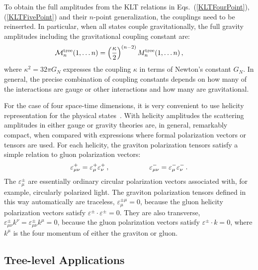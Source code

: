 \documentclass[12pt]{livrev}
\begin{document}
To obtain the full amplitudes from the KLT relations in
Eqs.~(\ref{KLTFourPoint}), (\ref{KLTFivePoint}) and their $n$-point
generalization, the couplings need to be reinserted.  In particular,
when all states couple gravitationally, the full gravity amplitudes
including the gravitational coupling constant are:
%
\begin{equation}
{\cal M}_n^{\rm tree} (1,\ldots n) = 
\left({  \kappa \over 2} \right)^{(n-2)} 
M_n^{\rm tree}(1,\ldots n)\,, \hskip 1 cm 
\label{GravityCouplingAmplitude}
\end{equation}
where $\kappa^2 = 32\pi G_N$ expresses the coupling $\kappa$ in terms
of Newton's constant $G_N$.  In general, the precise combination of
coupling constants depends on how many of the interactions are gauge 
or other interactions and how many are gravitational.

For the case of four space-time dimensions, it is very convenient to
use helicity representation for the physical
states~\cite{Causmaecker81,Kleiss85,Xu87}.  With helicity amplitudes
the scattering amplitudes in either gauge or gravity theories are, in
general, remarkably compact, when compared with expressions where formal
polarization vectors or tensors are used.  For each helicity, the
graviton polarization tensors satisfy a simple relation to gluon
polarization vectors:
%
\begin{equation}
\varepsilon_{\mu\nu}^+ = \varepsilon_{\mu}^+ \varepsilon_{\nu}^+\,,
\hskip 2 cm 
\varepsilon_{\mu\nu}^- = \varepsilon_{\mu}^- \varepsilon_{\nu}^- \,.
\end{equation}
%
The $\varepsilon_{\mu}^\pm$ are essentially ordinary circular
polarization vectors associated with, for example, circularly
polarized light.  The graviton polarization tensors defined in this
way automatically are traceless, $\varepsilon_{\mu}^{\pm\mu} = 0$,
because the gluon helicity polarization vectors satisfy
$\varepsilon^\pm \cdot \varepsilon^\pm = 0$.  They are also
transverse, $\varepsilon_{\mu\nu}^\pm k^\nu = \varepsilon_{\mu\nu}^\pm
k^\mu = 0$, because the gluon polarization vectors satisfy
$\varepsilon^\pm \cdot k = 0$, where $k^\mu$ is the four momentum of
either the graviton or gluon.


\subsection{Tree-level Applications}
\end{document}
